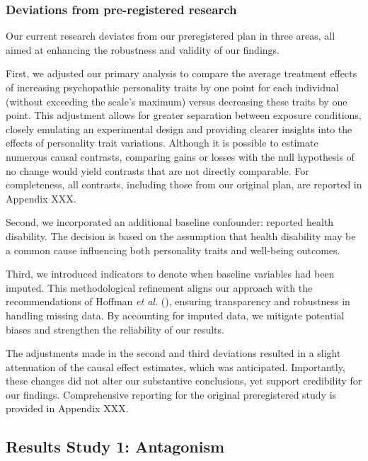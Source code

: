 \documentclass[
  singlecolumn]{article}
\begin{document}
\subsubsection{Deviations from pre-registered
research}\label{deviations-from-pre-registered-research}

Our current research deviates from our preregistered plan in three
areas, all aimed at enhancing the robustness and validity of our
findings.

First, we adjusted our primary analysis to compare the average treatment
effects of increasing psychopathic personality traits by one point for
each individual (without exceeding the scale's maximum) versus
decreasing these traits by one point. This adjustment allows for greater
separation between exposure conditions, closely emulating an
experimental design and providing clearer insights into the effects of
personality trait variations. Although it is possible to estimate
numerous causal contrasts, comparing gains or losses with the null
hypothesis of no change would yield contrasts that are not directly
comparable. For completeness, all contrasts, including those from our
original plan, are reported in Appendix XXX.

Second, we incorporated an additional baseline confounder: reported
health disability. The decision is based on the assumption that health
disability may be a common cause influencing both personality traits and
well-being outcomes.

Third, we introduced indicators to denote when baseline variables had
been imputed. This methodological refinement aligns our approach with
the recommendations of Hoffman \emph{et al.}
(), ensuring transparency and robustness
in handling missing data. By accounting for imputed data, we mitigate
potential biases and strengthen the reliability of our results.

The adjustments made in the second and third deviations resulted in a
slight attenuation of the causal effect estimates, which was
anticipated. Importantly, these changes did not alter our substantive
conclusions, yet support credibility for our findings. Comprehensive
reporting for the original preregistered study is provided in Appendix
XXX.

\subsection{Results Study 1:
Antagonism}\label{results-study-1-antagonism}
\end{document}

